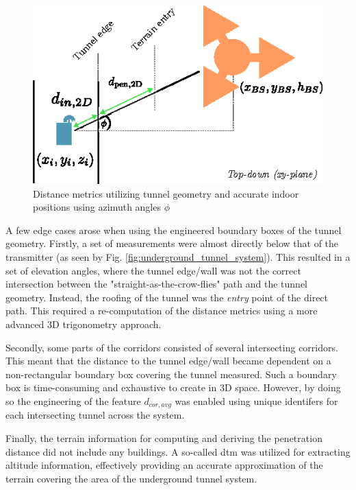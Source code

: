 \begin{figure}
    \centering
    \includegraphics{chapters/part_pathloss/figures/outdoor_to_indoor/inside_distance_illustration_xyplane.eps}
    \caption{Distance metrics utilizing tunnel geometry and accurate indoor positions using azimuth angles $\phi$}
    \label{fig:inside_distance_xy}
\end{figure}

\noindent A few edge cases arose when using the engineered boundary boxes of the tunnel geometry. Firstly, a set of measurements were almost directly below that of the transmitter (as seen by Fig. \ref{fig:underground_tunnel_system}). This resulted in a set of elevation angles, where the tunnel edge/wall was not the correct intersection between the "straight-as-the-crow-flies" path and the tunnel geometry. Instead, the roofing of the tunnel was the \emph{entry} point of the direct path. This required a re-computation of the distance metrics using a more advanced $3$D trigonometry approach. 

Secondly, some parts of the corridors consisted of several intersecting corridors. This meant that the distance to the tunnel edge/wall became dependent on a non-rectangular boundary box covering the tunnel measured. Such a boundary box is time-consuming and exhaustive to create in $3$D space. However, by doing so the engineering of the feature $d_{cor,avg}$ was enabled using unique identifers for each intersecting tunnel across the system.

Finally, the terrain information for computing and deriving the penetration distance did not include any buildings. A so-called \gls{dtm} \cite{kortforsyningen} was utilized for extracting altitude information, effectively providing an accurate approximation of the terrain covering the area of the underground tunnel system.


